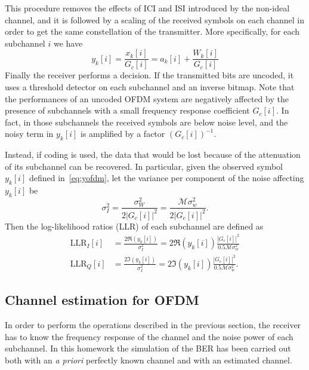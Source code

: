 \documentclass[10pt]{article}
\newcommand{\ofdM} {\mathcal{M}}
\begin{document}
This procedure removes the effects of ICI and ISI introduced by the non-ideal channel, and it is followed by a scaling of the received symbols on each channel in order to get the same constellation of the transmitter. More specifically, for each subchannel $i$ we have
\begin{equation}
	y_k[i] = \frac{x_k[i]}{G_c[i]} = a_k[i] + \frac{W_k[i]}{G_c[i]}
	\label{eq:yofdm}
\end{equation}
Finally the receiver performs a decision. If the transmitted bits are uncoded, it uses a threshold detector on each subchannel and an inverse bitmap. Note that the performances of an uncoded OFDM system are negatively affected by the presence of subchannels with a small frequency response coefficient $G_c[i]$. In fact, in those subchannels the received symbols are below noise level, and the noisy term in $y_k[i]$ is amplified by a factor $(G_c[i])^{-1}$.

Instead, if coding is used, the data that would be lost because of the attenuation of its subchannel can be recovered. In particular, given the observed symbol $y_k[i]$ defined in~\eqref{eq:yofdm}, let the variance per component of the noise affecting $y_k[i]$ be
\begin{equation}
	\sigma_I^2 = \frac{\sigma_W^2}{2 |G_c[i]|^2} = \frac{\ofdM \sigma_w^2}{2 |G_c[i]|^2}.
\end{equation}
Then the log-likelihood ratios (LLR) of each subchannel are defined as
\begin{equation}
\begin{aligned}
	\mathrm{LLR}_I [i] &= \frac{2\Re(y_k[i])}{\sigma_I^2} = 2\Re(y_k[i]) \frac{|G_c[i]|^2 }{0.5 \ofdM \sigma_w^2} \\
	\mathrm{LLR}_Q [i] &= \frac{2\Im(y_k[i])}{\sigma_I^2} = 2\Im(y_k[i]) \frac{|G_c[i]|^2 }{0.5 \ofdM \sigma_w^2}.
\end{aligned}
\end{equation}

\subsection*{Channel estimation for OFDM}
In order to perform the operations described in the previous section, the receiver has to know the frequency response of the channel and the noise power of each subchannel. In this homework the simulation of the BER has been carried out both with an \textit{a priori} perfectly known channel and with an estimated channel. 
\end{document}

